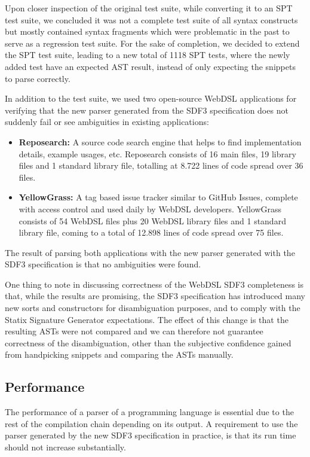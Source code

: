     Upon closer inspection of the original test suite, while converting it to an SPT test suite, we concluded it was not a complete test suite of all syntax constructs but mostly contained syntax fragments which were problematic in the past to serve as a regression test suite. For the sake of completion, we decided to extend the SPT test suite, leading to a new total of 1118 SPT tests, where the newly added test have an expected AST result, instead of only expecting the snippets to parse correctly.

    In addition to the test suite, we used two open-source WebDSL applications for verifying that the new parser generated from the SDF3 specification does not suddenly fail or see ambiguities in existing applications:

    \begin{itemize}
      \item \textbf{Reposearch:} A source code search engine that helps to find implementation details, example usages, etc. Reposearch consists of 16 main files, 19 library files and 1 standard library file, totalling at 8.722 lines of code spread over 36 files.
      \item \textbf{YellowGrass:} A tag based issue tracker similar to GitHub Issues, complete with access control and used daily by WebDSL developers. YellowGrass consists of 54 WebDSL files plus 20 WebDSL library files and 1 standard library file, coming to a total of 12.898 lines of code spread over 75 files.
    \end{itemize}

    The result of parsing both applications with the new parser generated with the SDF3 specification is that no ambiguities were found.

    One thing to note in discussing correctness of the WebDSL SDF3 completeness is that, while the results are promising, the SDF3 specification has introduced many new sorts and constructors for disambiguation purposes, and to comply with the Statix Signature Generator expectations. The effect of this change is that the resulting ASTs were not compared and we can therefore not guarantee correctness of the disambiguation, other than the subjective confidence gained from handpicking snippets and comparing the ASTs manually.

  \subsection{Performance}

    The performance of a parser of a programming language is essential due to the rest of the compilation chain depending on its output. A requirement to use the parser generated by the new SDF3 specification in practice, is that its run time should not increase substantially.

